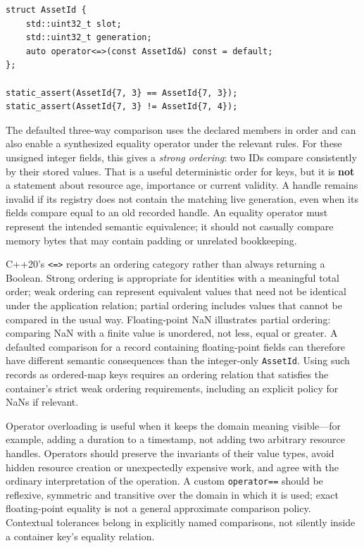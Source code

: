 \begin{verbatim}
struct AssetId {
    std::uint32_t slot;
    std::uint32_t generation;
    auto operator<=>(const AssetId&) const = default;
};

static_assert(AssetId{7, 3} == AssetId{7, 3});
static_assert(AssetId{7, 3} != AssetId{7, 4});
\end{verbatim}

The defaulted three-way comparison uses the declared members in order and can also enable a synthesized equality operator under the relevant rules. For these unsigned integer fields, this gives a \emph{strong ordering}: two IDs compare consistently by their stored values. That is a useful deterministic order for keys, but it is \textbf{not} a statement about resource age, importance or current validity. A handle remains invalid if its registry does not contain the matching live generation, even when its fields compare equal to an old recorded handle. An equality operator must represent the intended semantic equivalence; it should not casually compare memory bytes that may contain padding or unrelated bookkeeping.

C++20's \texttt{\textless{}=\textgreater{}} reports an ordering category rather than always returning a Boolean. Strong ordering is appropriate for identities with a meaningful total order; weak ordering can represent equivalent values that need not be identical under the application relation; partial ordering includes values that cannot be compared in the usual way. Floating-point NaN illustrates partial ordering: comparing NaN with a finite value is unordered, not less, equal or greater. A defaulted comparison for a record containing floating-point fields can therefore have different semantic consequences than the integer-only \texttt{AssetId}. Using such records as ordered-map keys requires an ordering relation that satisfies the container's strict weak ordering requirements, including an explicit policy for NaNs if relevant.

Operator overloading is useful when it keeps the domain meaning visible---for example, adding a duration to a timestamp, not adding two arbitrary resource handles. Operators should preserve the invariants of their value types, avoid hidden resource creation or unexpectedly expensive work, and agree with the ordinary interpretation of the operation. A custom \texttt{operator==} should be reflexive, symmetric and transitive over the domain in which it is used; exact floating-point equality is not a general approximate comparison policy. Contextual tolerances belong in explicitly named comparisons, not silently inside a container key's equality relation.


